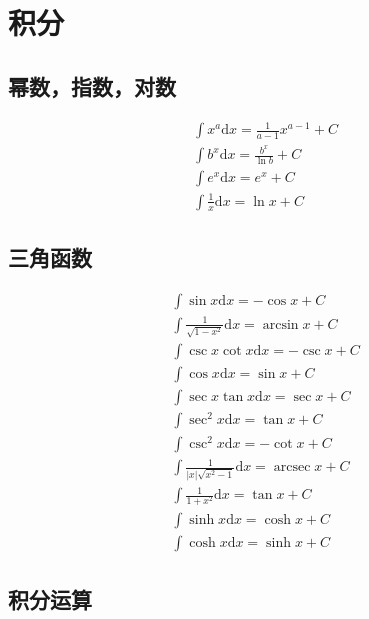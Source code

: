 \section{积分}
\subsection{幂数，指数，对数}
\begin{align}
&\int x^a \mathrm{d}{x} = \frac{1}{a-1}x^{a-1} + C\\
&\int b^x \mathrm{d}{x} = \frac{b^x}{\ln b} + C\\
&\int e^x \mathrm{d}{x} = e^x + C\\
&\int \frac{1}{x} \mathrm{d}{x} = \ln x + C
\end{align}
\subsection{三角函数}
\begin{align}
&\int\sin x \mathrm{d}{x} = -\cos x + C\\
&\int\frac{1}{\sqrt{1-x^2}}\mathrm{d}{x} = \arcsin x + C \\
&\int\csc x\cot x \mathrm{d}{x} = -\csc x + C\\
&\int\cos x \mathrm{d}{x} = \sin x + C \\
&\int\sec x \tan x\mathrm{d}{x} = \sec x + C \\
&\int\sec^2 x\mathrm{d}{x} = \tan x + C \\
&\int\csc^2 x\mathrm{d}{x} = -\cot x +C \\
&\int\frac{1}{\left|x\right|\sqrt{x^2-1}}\mathrm{d}{x} = \operatorname{arcsec} x + C \\
&\int\frac{1}{1+x^2}\mathrm{d}{x} = \tan x + C\\
&\int\sinh x \mathrm{d}{x} = \cosh x + C\\
&\int\cosh x \mathrm{d}{x} = \sinh x + C
\end{align}
\subsection{积分运算}
